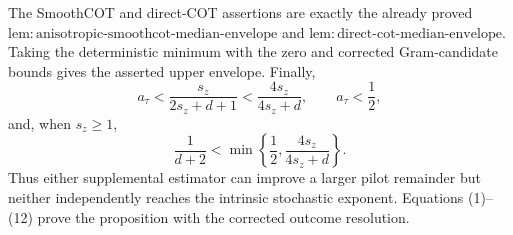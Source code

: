 The SmoothCOT and direct-COT assertions are exactly the already proved \(\mathrm{lem{:}anisotropic\text{-}smoothcot\text{-}median\text{-}envelope}\) and \(\mathrm{lem{:}direct\text{-}cot\text{-}median\text{-}envelope}\). Taking the deterministic minimum with the zero and corrected Gram-candidate bounds gives the asserted upper envelope. Finally,
\[
a_\tau<\frac{s_z}{2s_z+d+1}<\frac{4s_z}{4s_z+d},
\qquad a_\tau<\frac12,                                          \tag{11}
\]
and, when \(s_z\ge1\),
\[
\frac1{d+2}<\min\!\left\{\frac12,\frac{4s_z}{4s_z+d}\right\}. \tag{12}
\]
Thus either supplemental estimator can improve a larger pilot remainder but neither independently reaches the intrinsic stochastic exponent. Equations (1)--(12) prove the proposition with the corrected outcome resolution.